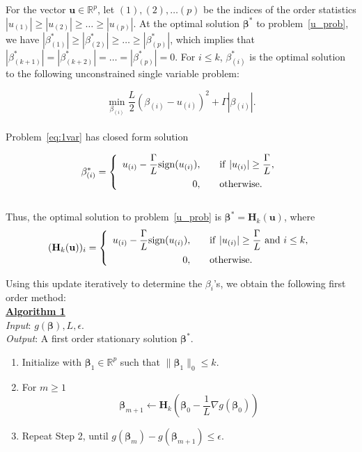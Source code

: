 \documentclass[12pt]{article}
\newcommand{\M}{\mathbf}
\newcommand{\MS}{\boldsymbol}
\newcommand{\R}{\mathbb{R}}
\newcommand{\1}{\mathds{1}}
\begin{document}
For the vector $\M u \in \R^p$, let $(1), (2), \ldots (p)$ be the indices of the order statistics $|u_{(1)}| \ge |u_{(2)}| \ge \ldots \ge |u_{(p)}|$.  At the optimal solution $\MS \beta^*$ to problem~\ref{u_prob}, we have $|\beta_{(1)}^*| \ge |\beta_{(2)}^*| \ge \ldots \ge |\beta_{(p)}^*|$, which implies that $|\beta_{(k+1)}^*| = |\beta_{(k + 2)}^*| = \ldots = |\beta_{(p)}^*| = 0$.  For $i \le k$, $\beta_{(i)}^*$ is the optimal solution to the following unconstrained single variable problem:

\begin{equation}
\label{eq:1var}
\min \limits_{\beta_{(i)}} \frac{L}{2}(\beta_{(i)} - u_{(i)})^2 + \Gamma |\beta_{(i)} |.
\end{equation}\\

Problem~\ref{eq:1var} has closed form solution

\begin{equation}
\beta_{(i)}^* = \left\{\begin{array}{rl} 
u_{(i)} - \displaystyle \frac{\Gamma}{L}\text{sign}(u_{(i)}), &~~~{\rm if}~|u_{(i)}| \ge \displaystyle \frac{\Gamma}{L}, \vspace{5pt}\\
0, &~~~\rm{otherwise.}
\end{array} \right.
\end{equation}\\

Thus, the optimal solution to problem~\ref{u_prob} is $\MS \beta^* = \M H_k(\M u)$, where
\begin{equation}
(\M H_k(\M u))_i = \left\{\begin{array}{rl} 
u_{(i)} - \displaystyle \frac{\Gamma}{L}\text{sign}(u_{(i)}), &~~~{\rm if}~|u_{(i)}| \ge \displaystyle \frac{\Gamma}{L}~{\rm and}~i \le k, \vspace{5pt}\\
0, &~~~\rm{otherwise.}
\end{array} \right.
\end{equation}

Using this update iteratively to determine the $\beta_i$'s, we obtain the following first order method:\\

\underline{\bf Algorithm 1}\\

\emph{Input}: $g(\MS \beta), L, \epsilon$.\\

\emph{Output}: A first order stationary solution $\MS \beta^*$.

\begin{enumerate}
	\item Initialize with $\MS \beta_1 \in \R^p$ such that $\|\MS \beta_1\|_0 \le k$.
	\item For $m \ge 1$
	\[
	\MS \beta_{m+1} \leftarrow \M H_k(\MS \beta_0 - \frac{1}{L} \nabla g(\MS \beta_0))
	\]
	\item Repeat Step 2, until $g(\MS \beta_m) - g(\MS \beta_{m+1}) \le \epsilon$.
\end{enumerate}
\end{document}
